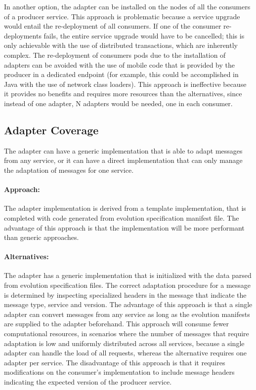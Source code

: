 In another option, the adapter can be installed on the nodes of all the consumers of a producer service.
This approach is problematic because a service upgrade would entail the re-deployment of all consumers.
If one of the consumer re-deployments fails, the entire service upgrade would have to be cancelled;
this is only achievable with the use of distributed transactions, which are inherently complex.
The re-deployment of consumers pods due to the installation of adapters can be avoided with the use of mobile code that is provided by the producer in a dedicated endpoint
(for example, this could be accomplished in Java with the use of network class loaders).
This approach is ineffective because it provides no benefits and requires more resources than the alternatives, since
instead of one adapter, N adapters would be needed, one in each consumer.

\subsection{Adapter Coverage} %
\label{sec:adapter_polymorphism}

The adapter can have a generic implementation that is able to adapt messages from any service, or it can
have a direct implementation that can only manage the adaptation of messages for one service.

\paragraph{Approach:}
The adapter implementation is derived from a template implementation,
that is completed with code generated from evolution specification manifest file.
The advantage of this approach is that the implementation will be more performant than generic approaches.

\paragraph{Alternatives:}
The adapter has a generic implementation that is initialized with the data parsed from evolution specification files.
The correct adaptation procedure for a message is determined by inspecting specialized headers in the
message that indicate the message type, service and version.
The advantage of this approach is that a single adapter can convert messages from any service as long as the evolution manifests are supplied to the adapter beforehand.
This approach will consume fewer computational resources, in scenarios where the number of messages that require adaptation is low and uniformly distributed across all services,
because a single adapter can handle the load of all requests, whereas the alternative requires one adapter per service.
The disadvantage of this approach is that it requires modifications on the consumer's implementation to include message headers indicating the expected version of the producer service.

